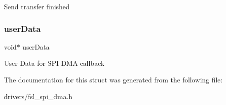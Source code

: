 Send transfer finished \mbox{\label{struct__spi__dma__handle_a2e294dd14122c554baa0665072b4ca7a}} 
\subsubsection{\texorpdfstring{userData}{userData}}
{\footnotesize\ttfamily void$\ast$ user\+Data}

User Data for S\+PI D\+MA callback 

The documentation for this struct was generated from the following file\+:\begin{DoxyCompactItemize}
\item 
drivers/fsl\+\_\+spi\+\_\+dma.\+h\end{DoxyCompactItemize}
